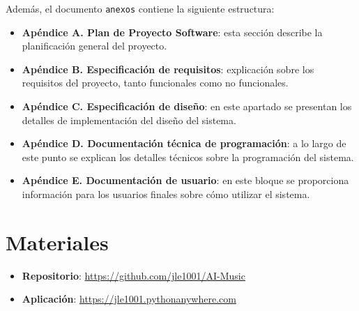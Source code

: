 Además, el documento \texttt{anexos} contiene la siguiente estructura:

\begin{itemize}
\tightlist
\item \textbf{Apéndice A. Plan de Proyecto Software}: esta sección describe la planificación general del proyecto.
\item \textbf{Apéndice B. Especificación de requisitos}: explicación sobre los requisitos del proyecto, tanto funcionales como no funcionales.
\item \textbf{Apéndice C. Especificación de diseño}: en este apartado se presentan los detalles de implementación del diseño del sistema.
\item \textbf{Apéndice D. Documentación técnica de programación}: a lo largo de este punto se explican los detalles técnicos sobre la programación del sistema.
\item \textbf{Apéndice E. Documentación de usuario}: en este bloque se proporciona información para los usuarios finales sobre cómo utilizar el sistema.
\end{itemize}

\section{Materiales}

\begin{itemize}
\tightlist
\item \textbf{Repositorio}: \url{https://github.com/jle1001/AI-Music}
\item \textbf{Aplicación}: \url{https://jle1001.pythonanywhere.com}
\end{itemize}